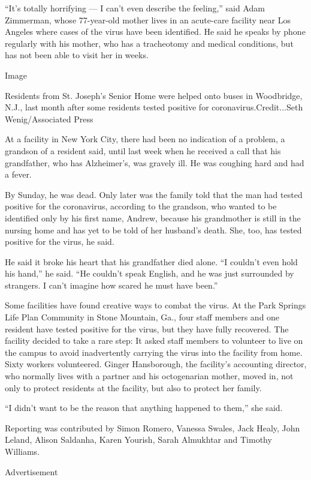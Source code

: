 ``It's totally horrifying --- I can't even describe the feeling,'' said
Adam Zimmerman, whose 77-year-old mother lives in an acute-care facility
near Los Angeles where cases of the virus have been identified. He said
he speaks by phone regularly with his mother, who has a tracheotomy and
medical conditions, but has not been able to visit her in weeks.

Image

Residents from St. Joseph's Senior Home were helped onto buses in
Woodbridge, N.J., last month after some residents tested positive for
coronavirus.Credit...Seth Wenig/Associated Press

At a facility in New York City, there had been no indication of a
problem, a grandson of a resident said, until last week when he received
a call that his grandfather, who has Alzheimer's, was gravely ill. He
was coughing hard and had a fever.

By Sunday, he was dead. Only later was the family told that the man had
tested positive for the coronavirus, according to the grandson, who
wanted to be identified only by his first name, Andrew, because his
grandmother is still in the nursing home and has yet to be told of her
husband's death. She, too, has tested positive for the virus, he said.

He said it broke his heart that his grandfather died alone. ``I couldn't
even hold his hand,'' he said. ``He couldn't speak English, and he was
just surrounded by strangers. I can't imagine how scared he must have
been.''

Some facilities have found creative ways to combat the virus. At the
Park Springs Life Plan Community in Stone Mountain, Ga., four staff
members and one resident have tested positive for the virus, but they
have fully recovered. The facility decided to take a rare step: It asked
staff members to volunteer to live on the campus to avoid inadvertently
carrying the virus into the facility from home. Sixty workers
volunteered. Ginger Hansborough, the facility's accounting director, who
normally lives with a partner and his octogenarian mother, moved in, not
only to protect residents at the facility, but also to protect her
family.

``I didn't want to be the reason that anything happened to them,'' she
said.

Reporting was contributed by Simon Romero, Vanessa Swales, Jack Healy,
John Leland, Alison Saldanha, Karen Yourish, Sarah Almukhtar and Timothy
Williams.

Advertisement


